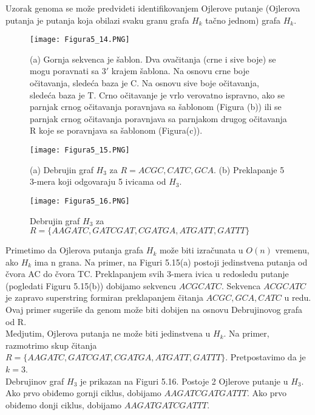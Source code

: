 \documentclass{article}
\begin{document}
Uzorak genoma se može predvideti identifikovanjem Ojlerove putanje (Ojlerova putanja je putanja koja obilazi svaku granu grafa $H_k$ tačno jednom) grafa $H_k$. \\

\begin{figure}[h]
\centering
\texttt{[image: Figura5\_14.PNG]}
\caption{(a) Gornja sekvenca je šablon. Dva ovačitanja (crne i sive boje) se mogu poravnati sa $3'$ krajem šablona. Na osnovu crne boje očitavanja, sledeća baza je C. Na osnovu sive boje očitavanja, sledeća baza je T. Crno očitavanje je vrlo verovatno ispravno, ako se parnjak crnog očitavanja poravnjava sa šablonom (Figura (b)) ili se parnjak crnog očitavanja poravnjava sa parnjakom drugog očitavanja R koje se poravnjava sa šablonom (Figura(c)).}
\end{figure}

\begin{figure}[h]
\centering
\texttt{[image: Figura5\_15.PNG]}
\caption{(a) Debrujin graf $H_3$ za $R = {ACGC, CATC, GCA}$. (b)
 Preklapanje 5 3-mera koji odgovaraju 5 ivicama od $H_3$.}
 \end{figure}

\begin{figure}[h]
\centering
\texttt{[image: Figura5\_16.PNG]}
\caption{Debrujin graf $H_3$ za $R = \{AAGATC, GATCGAT, CGATGA, ATGATT, GATTT\}$ }
\end{figure}


Primetimo da Ojlerova putanja grafa $H_k$ može biti izračunata u $O(n)$ vremenu, ako $H_k$ ima n grana. Na primer, na Figuri 5.15(a) postoji jedinstvena putanja od čvora AC do čvora TC. Preklapanjem svih 3-mera ivica u redosledu putanje (pogledati Figuru 5.15(b)) dobijamo sekvencu $ACGCATC$. Sekvenca $ACGCATC$ je zapravo superstring formiran preklapanjem čitanja $ACGC, GCA, CATC$ u redu. Ovaj primer sugeriše da genom može biti dobijen na osnovu Debrujinovog grafa od R.\\

Medjutim, Ojlerova putanja ne može biti jedinstvena u $H_k$. Na primer, razmotrimo skup čitanja $R = \{AAGATC, GATCGAT, CGATGA, ATGATT, GATTT\}$. Pretpostavimo da je $k = 3$.\\

Debrujinov graf $H_3$ je prikazan na Figuri 5.16. Postoje 2 Ojlerove putanje u $H_3$. Ako prvo obiđemo gornji ciklus, dobijamo $AAGATCGATGATTT$. Ako prvo obiđemo donji ciklus, dobijamo $AAGATGATCGATTT$. \\
\end{document}
